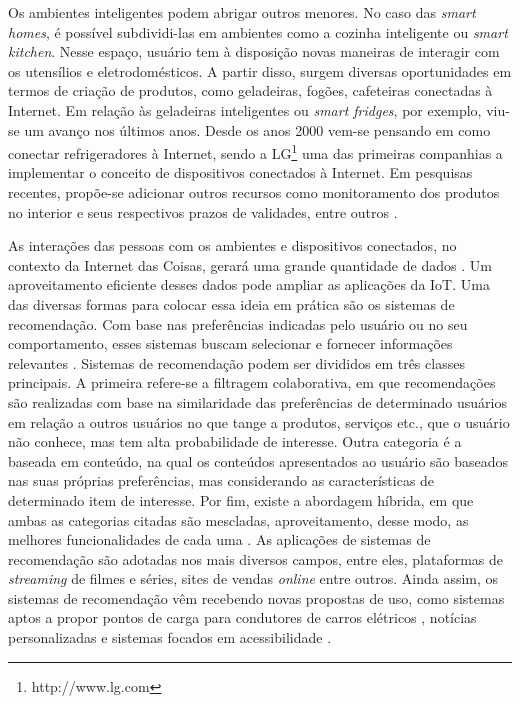 Os ambientes inteligentes podem abrigar outros menores. No caso das \textit{smart homes}, é possível subdividi-las em ambientes como a cozinha inteligente ou \textit{smart kitchen}. Nesse espaço, usuário tem à disposição novas maneiras de interagir com os utensílios e eletrodomésticos. A partir disso, surgem diversas oportunidades em termos de criação de produtos, como geladeiras, fogões, cafeteiras conectadas à Internet. Em relação às geladeiras inteligentes ou \textit{smart fridges}, por exemplo, viu-se um avanço nos últimos anos. Desde os anos 2000 vem-se pensando em como conectar refrigeradores à Internet, sendo a LG\textsuperscript{\textregistered}\footnote{http://www.lg.com} uma das primeiras companhias a implementar o conceito de dispositivos conectados à Internet. Em pesquisas recentes, propõe-se adicionar outros recursos como monitoramento dos produtos no interior e seus respectivos prazos de validades, entre outros \cite{Hachani2016}. 

As interações das pessoas com os ambientes e dispositivos conectados, no contexto da Internet das Coisas, gerará uma grande quantidade de dados \cite{Chiang2016}. Um aproveitamento eficiente desses dados pode ampliar as aplicações da IoT. Uma das diversas formas para colocar essa ideia em prática são os sistemas de recomendação. Com base nas preferências indicadas pelo usuário ou no seu comportamento, esses sistemas buscam selecionar e fornecer informações relevantes \cite{Filho2008}. Sistemas de recomendação podem ser divididos em três classes principais. A primeira refere-se a filtragem colaborativa, em que recomendações são realizadas com base na similaridade das preferências de determinado usuários em relação a outros usuários no que tange a produtos, serviços etc., que o usuário não conhece, mas tem alta probabilidade de interesse. Outra categoria é a baseada em conteúdo, na qual os conteúdos apresentados ao usuário são baseados nas suas próprias preferências, mas considerando as características de determinado item de interesse. Por fim, existe a abordagem híbrida, em que ambas as categorias citadas são mescladas, aproveitamento, desse modo, as melhores funcionalidades de cada uma \cite{Thomas2016}.
As aplicações de sistemas de recomendação são adotadas nos mais diversos campos, entre eles, plataformas de \textit{streaming} de filmes e séries, sites de vendas \textit{online} entre outros. Ainda assim, os sistemas de recomendação vêm recebendo novas propostas de uso, como sistemas aptos a propor pontos de carga para condutores de carros elétricos \cite{Ferreira2011}, notícias personalizadas \cite{Yeung2010} e sistemas focados em acessibilidade \cite{GomesCardoso2016}. 


